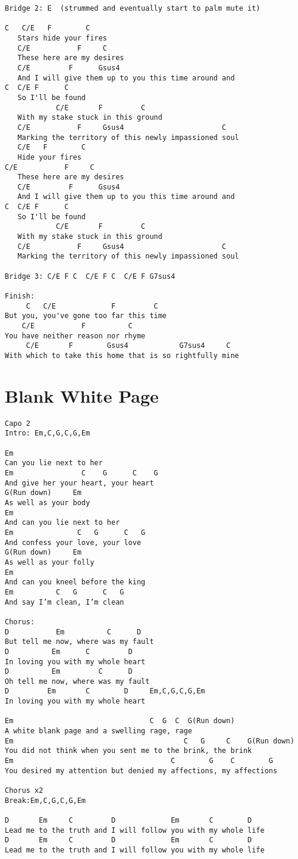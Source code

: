 \documentclass[leqno]{memoir}
\begin{document}
\begin{verbatim}
Bridge 2: E  (strummed and eventually start to palm mute it)

C   C/E   F        C       
   Stars hide your fires
   C/E           F     C
   These here are my desires
   C/E         F      Gsus4                         
   And I will give them up to you this time around and
C  C/E F      C
   So I'll be found
            C/E       F         C
   With my stake stuck in this ground
   C/E           F     Gsus4                       C
   Marking the territory of this newly impassioned soul
   C/E   F        C   
   Hide your fires
C/E           F     C
   These here are my desires
   C/E         F      Gsus4                         
   And I will give them up to you this time around and
C  C/E F      C
   So I'll be found
            C/E       F         C
   With my stake stuck in this ground
   C/E           F     Gsus4                       C
   Marking the territory of this newly impassioned soul
   
Bridge 3: C/E F C  C/E F C  C/E F G7sus4

Finish:
     C   C/E             F         C
But you, you've gone too far this time
    C/E           F          C
You have neither reason nor rhyme
     C/E       F        Gsus4            G7sus4     C
With which to take this home that is so rightfully mine

\end{verbatim}
\newpage

\chapter{Blank White Page}
\begin{verbatim}
Capo 2
Intro: Em,C,G,C,G,Em

Em
Can you lie next to her
Em                C    G      C    G
And give her your heart, your heart
G(Run down)     Em
As well as your body
Em
And can you lie next to her
Em               C   G      C   G
And confess your love, your love
G(Run down)     Em
As well as your folly
Em
And can you kneel before the king
Em          C   G      C   G
And say I’m clean, I’m clean

Chorus:
D           Em          C      D
But tell me now, where was my fault
D          Em      C         D
In loving you with my whole heart
D          Em         C      D
Oh tell me now, where was my fault
D         Em       C        D     Em,C,G,C,G,Em
In loving you with my whole heart

Em                                C  G  C  G(Run down)
A white blank page and a swelling rage, rage
Em                                        C   G     C    G(Run down)
You did not think when you sent me to the brink, the brink
Em                                     C        G    C        G
You desired my attention but denied my affections, my affections

Chorus x2
Break:Em,C,G,C,G,Em

D       Em     C         D             Em       C        D
Lead me to the truth and I will follow you with my whole life
D       Em     C         D             Em       C        D
Lead me to the truth and I will follow you with my whole life 
\end{verbatim}
\newpage
\end{document}
